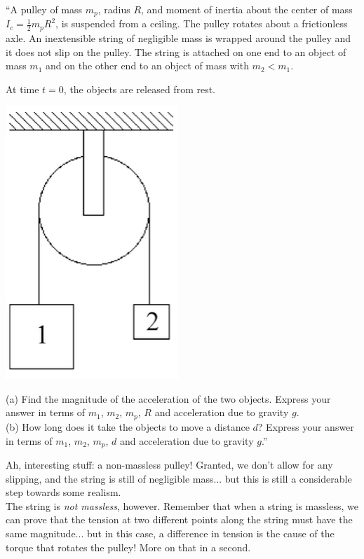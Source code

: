 \documentclass[8.01x]{subfiles}
\begin{document}
``A pulley of mass $m_p$, radius $R$, and moment of inertia about the center of mass $\displaystyle I_c = \frac{1}{2} m_p R^2$, is suspended from a ceiling. The pulley rotates about a frictionless axle. An inextensible string of negligible mass is wrapped around the pulley and it does not slip on the pulley. The string is attached on one end to an object of mass $m_1$ and on the other end to an object of mass with $m_2 < m_1$.

At time $t = 0$, the objects are released from rest.

\begin{center}
\includegraphics[scale=0.65]{Graphics/h7p3}
\end{center}

(a) Find the magnitude of the acceleration of the two objects. Express your answer in terms of $m_1$, $m_2$, $m_p$, $R$ and acceleration due to gravity $g$.\\
(b) How long does it take the objects to move a distance $d$? Express your answer in terms of $m_1$, $m_2$, $m_p$, $d$ and acceleration due to gravity $g$.''

Ah, interesting stuff: a non-massless pulley! Granted, we don't allow for any slipping, and the string is still of negligible mass... but this is still a considerable step towards some realism.\\
The string is \emph{not massless}, however. Remember that when a string is massless, we can prove that the tension at two different points along the string must have the same magnitude... but in this case, a difference in tension is the cause of the torque that rotates the pulley! More on that in a second.
\end{document}
